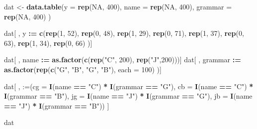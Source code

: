 \documentclass[
]{article}
\newenvironment{Shaded}{\begin{snugshade}}{\end{snugshade}}
\newcommand{\AttributeTok}[1]{\textcolor[rgb]{0.13,0.29,0.53}{#1}}
\newcommand{\ConstantTok}[1]{\textcolor[rgb]{0.56,0.35,0.01}{#1}}
\newcommand{\DecValTok}[1]{\textcolor[rgb]{0.00,0.00,0.81}{#1}}
\newcommand{\FunctionTok}[1]{\textcolor[rgb]{0.13,0.29,0.53}{\textbf{#1}}}
\newcommand{\NormalTok}[1]{#1}
\newcommand{\OtherTok}[1]{\textcolor[rgb]{0.56,0.35,0.01}{#1}}
\newcommand{\SpecialCharTok}[1]{\textcolor[rgb]{0.81,0.36,0.00}{\textbf{#1}}}
\newcommand{\StringTok}[1]{\textcolor[rgb]{0.31,0.60,0.02}{#1}}
\theoremstyle{definition}
\theoremstyle{definition}
\theoremstyle{definition}
\theoremstyle{definition}
\theoremstyle{remark}
\begin{document}
\begin{Shaded}
\begin{Highlighting}[]
\NormalTok{dat }\OtherTok{\textless{}{-}} \FunctionTok{data.table}\NormalTok{(}\AttributeTok{y       =} \FunctionTok{rep}\NormalTok{(}\ConstantTok{NA}\NormalTok{, }\DecValTok{400}\NormalTok{),}
                  \AttributeTok{name    =} \FunctionTok{rep}\NormalTok{(}\ConstantTok{NA}\NormalTok{, }\DecValTok{400}\NormalTok{),}
                  \AttributeTok{grammar =} \FunctionTok{rep}\NormalTok{(}\ConstantTok{NA}\NormalTok{, }\DecValTok{400}\NormalTok{) )}

\NormalTok{dat[ , y }\SpecialCharTok{:=} \FunctionTok{c}\NormalTok{(}\FunctionTok{rep}\NormalTok{(}\DecValTok{1}\NormalTok{, }\DecValTok{52}\NormalTok{), }\FunctionTok{rep}\NormalTok{(}\DecValTok{0}\NormalTok{, }\DecValTok{48}\NormalTok{),}
              \FunctionTok{rep}\NormalTok{(}\DecValTok{1}\NormalTok{, }\DecValTok{29}\NormalTok{), }\FunctionTok{rep}\NormalTok{(}\DecValTok{0}\NormalTok{, }\DecValTok{71}\NormalTok{),}
              \FunctionTok{rep}\NormalTok{(}\DecValTok{1}\NormalTok{, }\DecValTok{37}\NormalTok{), }\FunctionTok{rep}\NormalTok{(}\DecValTok{0}\NormalTok{, }\DecValTok{63}\NormalTok{),}
              \FunctionTok{rep}\NormalTok{(}\DecValTok{1}\NormalTok{, }\DecValTok{34}\NormalTok{), }\FunctionTok{rep}\NormalTok{(}\DecValTok{0}\NormalTok{, }\DecValTok{66}\NormalTok{) )]}

\NormalTok{dat[ , name    }\SpecialCharTok{:=} \FunctionTok{as.factor}\NormalTok{(}\FunctionTok{c}\NormalTok{(}\FunctionTok{rep}\NormalTok{(}\StringTok{"C"}\NormalTok{, }\DecValTok{200}\NormalTok{), }\FunctionTok{rep}\NormalTok{(}\StringTok{"J"}\NormalTok{,}\DecValTok{200}\NormalTok{)))]}
\NormalTok{dat[ , grammar }\SpecialCharTok{:=} \FunctionTok{as.factor}\NormalTok{(}\FunctionTok{rep}\NormalTok{(}\FunctionTok{c}\NormalTok{(}\StringTok{"G"}\NormalTok{, }\StringTok{"B"}\NormalTok{, }\StringTok{"G"}\NormalTok{, }\StringTok{"B"}\NormalTok{), }\AttributeTok{each =} \DecValTok{100}\NormalTok{) )]}

\NormalTok{dat[ , }\StringTok{\textquotesingle{}:=\textquotesingle{}}\NormalTok{(}\AttributeTok{cg =} \FunctionTok{I}\NormalTok{(name }\SpecialCharTok{==} \StringTok{"C"}\NormalTok{) }\SpecialCharTok{*} \FunctionTok{I}\NormalTok{(grammar }\SpecialCharTok{==} \StringTok{"G"}\NormalTok{),}
           \AttributeTok{cb =} \FunctionTok{I}\NormalTok{(name }\SpecialCharTok{==} \StringTok{"C"}\NormalTok{) }\SpecialCharTok{*} \FunctionTok{I}\NormalTok{(grammar }\SpecialCharTok{==} \StringTok{"B"}\NormalTok{),}
           \AttributeTok{jg =} \FunctionTok{I}\NormalTok{(name }\SpecialCharTok{==} \StringTok{"J"}\NormalTok{) }\SpecialCharTok{*} \FunctionTok{I}\NormalTok{(grammar }\SpecialCharTok{==} \StringTok{"G"}\NormalTok{),}
           \AttributeTok{jb =} \FunctionTok{I}\NormalTok{(name }\SpecialCharTok{==} \StringTok{"J"}\NormalTok{) }\SpecialCharTok{*} \FunctionTok{I}\NormalTok{(grammar }\SpecialCharTok{==} \StringTok{"B"}\NormalTok{))}
\NormalTok{   ]}

\NormalTok{dat}
\end{Highlighting}
\end{Shaded}
\end{document}
